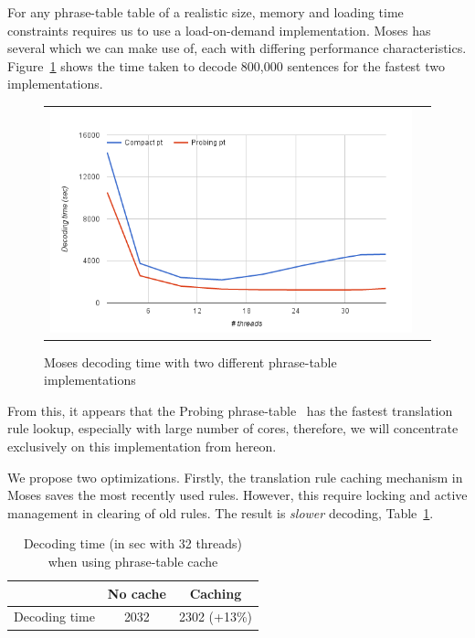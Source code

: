 \documentclass[11pt]{article}
\begin{document}
For any phrase-table table of a realistic size, memory and loading time constraints requires us to use a load-on-demand implementation. Moses has several which we can make use of, each with differing performance characteristics. Figure~\ref{fig:moses-phrase-tables-time} shows the time taken to decode 800,000 sentences for the fastest two implementations.
\begin{figure}[h]
\centering
\begin{tabular}{cc}
{\includegraphics[scale=0.4]{moses-phrase-table.png}} 
\end{tabular}
\caption{Moses decoding time with two different phrase-table implementations}
\label{fig:moses-phrase-tables-time}
\end{figure} 
From this, it appears that the Probing phrase-table~\cite{Bogoychev.probing.2016} has the fastest translation rule lookup, especially with large number of cores, therefore, we will concentrate exclusively on this implementation from hereon.

We propose two optimizations. Firstly, the translation rule caching mechanism in Moses saves the most recently used rules. However, this require locking and active management in clearing of old rules. The result is \emph{slower} decoding, Table~\ref{tab:phrase-table-cache}. 
\begin{table}[h]
\small
\begin{center}
\begin{tabular}{|l|c|c|} \hline
		& No cache	& Caching \\ \hline
Decoding time  	& 2032 		& 2302 (+13\%) \\ \hline
\end{tabular}
\end{center}
\caption{Decoding time (in sec with 32 threads) when using phrase-table cache}
\label{tab:phrase-table-cache}
\end{table}
\end{document}
